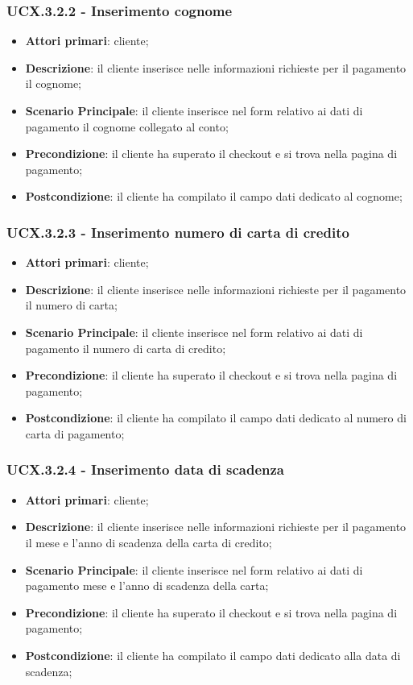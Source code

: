 \subsubsection{UCX.3.2.2 - Inserimento cognome}
\begin{itemize}
\item \textbf{Attori primari}: cliente;
\item \textbf{Descrizione}: il cliente inserisce nelle informazioni richieste per il pagamento il cognome;
\item \textbf{Scenario Principale}: il cliente inserisce nel form relativo ai dati di pagamento il cognome collegato al conto;
\item \textbf{Precondizione}: il cliente ha superato il checkout e si trova nella pagina di pagamento;
\item \textbf{Postcondizione}: il cliente ha compilato il campo dati dedicato al cognome;
\end{itemize}

\subsubsection{UCX.3.2.3 - Inserimento numero di carta di credito}
\begin{itemize}
\item \textbf{Attori primari}: cliente;
\item \textbf{Descrizione}: il cliente inserisce nelle informazioni richieste per il pagamento il numero di carta;
\item \textbf{Scenario Principale}: il cliente inserisce nel form relativo ai dati di pagamento il numero di carta di credito;
\item \textbf{Precondizione}: il cliente ha superato il checkout e si trova nella pagina di pagamento;
\item \textbf{Postcondizione}: il cliente ha compilato il campo dati dedicato al numero di carta di pagamento;
\end{itemize}

\subsubsection{UCX.3.2.4 - Inserimento data di scadenza}
\begin{itemize}
\item \textbf{Attori primari}: cliente;
\item \textbf{Descrizione}: il cliente inserisce nelle informazioni richieste per il pagamento il mese e l'anno di scadenza della carta di credito;
\item \textbf{Scenario Principale}: il cliente inserisce nel form relativo ai dati di pagamento mese e l'anno di scadenza della carta;
\item \textbf{Precondizione}: il cliente ha superato il checkout e si trova nella pagina di pagamento;
\item \textbf{Postcondizione}: il cliente ha compilato il campo dati dedicato alla data di scadenza;
\end{itemize}

